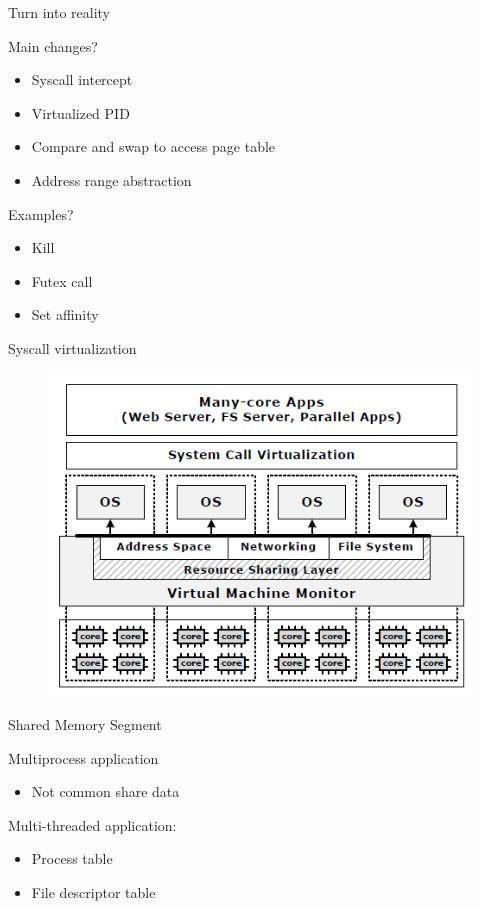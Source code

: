 \documentclass{beamer}
\begin{document}
	\begin{frame}{Turn into reality}

	Main changes?	
	\begin{itemize}
	\item Syscall intercept	
	\item Virtualized PID
	\item Compare and swap to access page table
	\item Address range abstraction
	\end{itemize}
	
	Examples?
	\begin{itemize}
	\item Kill
	\item Futex call
	\item Set affinity
	\end{itemize}	
	
	\end{frame}

	\begin{frame}{Syscall virtualization}
	
		\begin{figure} [H]
			\centering
			\includegraphics[scale=0.40]{img/syscall-virtualization}
		\end{figure}	

	\end{frame}
	
	\begin{frame}{Shared Memory Segment}
	
	Multiprocess application	
	
	\begin{itemize}	
		\item Not common share data
	\end{itemize}	
	
	Multi-threaded application:
	
	\begin{itemize}		
	\item Process table
	\item File descriptor table
	\end{itemize}
	
	\end{frame}
\end{document}
